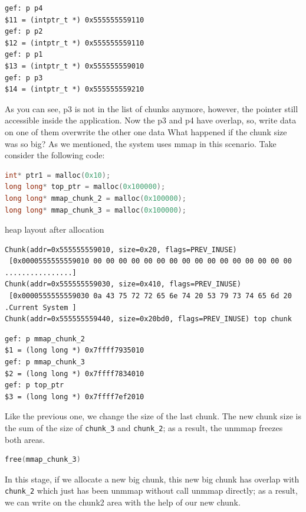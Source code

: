 \documentclass{masterthesis}
\begin{document}
\begin{lstlisting}[frame=tlrb]
gef: p p4
$11 = (intptr_t *) 0x555555559110
gef: p p2
$12 = (intptr_t *) 0x555555559110
gef: p p1
$13 = (intptr_t *) 0x555555559010
gef: p p3
$14 = (intptr_t *) 0x555555559210
 \end{lstlisting}

As you can see, p3 is not in the list of chunks anymore, however, the pointer still accessible inside the application. Now the p3 and p4 have overlap, so, write data on one of them overwrite the other one data
What happened if the chunk size was so big? As we mentioned, the system uses mmap in this scenario. Take consider the following code:

\begin{lstlisting}[language=c,frame=tlrb]
int* ptr1 = malloc(0x10);
long long* top_ptr = malloc(0x100000);
long long* mmap_chunk_2 = malloc(0x100000);
long long* mmap_chunk_3 = malloc(0x100000);
 \end{lstlisting}

heap layout after allocation

\begin{lstlisting}[frame=tlrb]
Chunk(addr=0x555555559010, size=0x20, flags=PREV_INUSE)
 [0x0000555555559010 00 00 00 00 00 00 00 00 00 00 00 00 00 00 00 00 ................]
Chunk(addr=0x555555559030, size=0x410, flags=PREV_INUSE)
 [0x0000555555559030 0a 43 75 72 72 65 6e 74 20 53 79 73 74 65 6d 20 .Current System ]
Chunk(addr=0x555555559440, size=0x20bd0, flags=PREV_INUSE) top chunk
 \end{lstlisting}

\begin{lstlisting}[frame=tlrb]
gef: p mmap_chunk_2
$1 = (long long *) 0x7ffff7935010
gef: p mmap_chunk_3
$2 = (long long *) 0x7ffff7834010
gef: p top_ptr
$3 = (long long *) 0x7ffff7ef2010
 \end{lstlisting}

Like the previous one, we change the size of the last chunk. The new chunk size is the sum of the size of \lstinline{chunk_3} and \lstinline{chunk_2}; as a result, the unmmap freezes both areas.

\begin{lstlisting}[language=c,frame=tlrb]
free(mmap_chunk_3)
 \end{lstlisting}

In this stage, if we allocate a new big chunk, this new big chunk has overlap with \lstinline{chunk_2} which just has been unmmap without call unmmap directly; as a result, we can write on the chunk2 area with the help of our new chunk.
\end{document}
